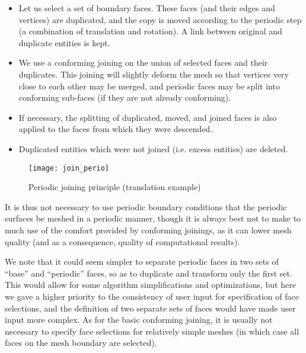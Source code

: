 \begin{itemize}

\item Let us select a set of boundary faces. These faces (and their
      edges and vertices) are duplicated, and the copy is moved
      according to the periodic step (a combination of translation
      and rotation). A link between original and duplicate
      entities is kept.

\item We use a conforming joining on the union of
      selected faces and their duplicates.
      This joining will slightly deform the mesh so that vertices
      very close to each other may be merged, and periodic
      faces may be split into conforming sub-faces (if they are
      not already conforming).

\item If necessary, the splitting of duplicated, moved, and joined
      faces is also applied to the faces from which they were
      descended.

\item Duplicated entities which were not joined (i.e. excess entities)
      are deleted.

\end{itemize}

\begin{figure}[!h]
\centerline{
\texttt{[image: join\_perio]}}
\caption{Periodic joining principle (translation example)}
\label{fig:algo.rc_perio}
\end{figure}

It is thus not necessary to use periodic boundary conditions
that the periodic surfaces be meshed in a periodic manner,
though it is always best not to make to much use of the
comfort provided by conforming joinings, as it can lower
mesh quality (and as a consequence, quality of computational
results).

We note that it could seem simpler to separate periodic faces
in two sets of ``base'' and ``periodic'' faces, so as
to duplicate and transform only the first set. This would
allow for some algorithm simplifications and optimizations,
but here we gave a higher priority to the consistency
of user input for specification of face selections, and
the definition of two separate sets of faces would have
made user input more complex. As for the basic
conforming joining, it is usually not necessary to specify
face selections for relatively simple meshes (in which case
all faces on the mesh boundary are selected).

